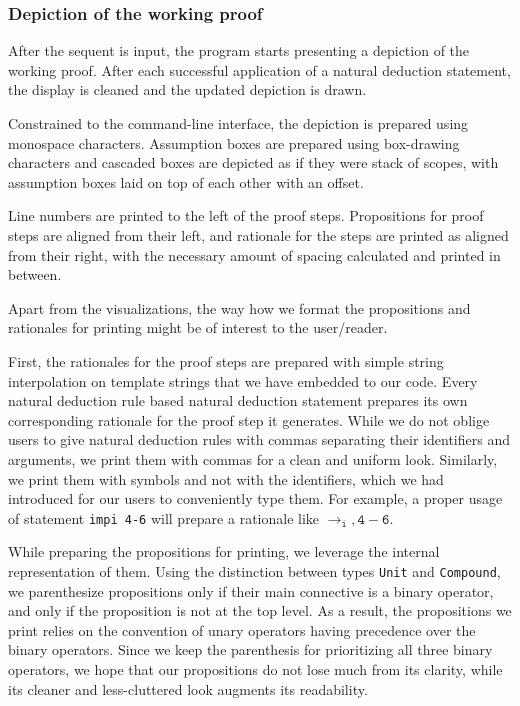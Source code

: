 \documentclass[12pt]{article}
\begin{document}
\subsubsection{Depiction of the working proof}

After the sequent is input, the program starts presenting a depiction
of the working proof. After each successful application of a natural
deduction statement, the display is cleaned and the updated depiction
is drawn.

Constrained to the command-line interface, the depiction is prepared
using monospace characters. Assumption boxes are prepared using
box-drawing characters and cascaded boxes are depicted as if they
were stack of scopes, with assumption boxes laid on top of each other
with an offset.

Line numbers are printed to the left of the proof steps.
Propositions for proof steps are aligned from their left,
and rationale for the steps are printed as aligned from their
right, with the necessary amount of spacing calculated and
printed in between.

Apart from the visualizations, the way how we format the propositions
and rationales for printing might be of interest to the user/reader.

First, the rationales for the proof steps are prepared with simple
string interpolation on template strings that we have embedded
to our code. Every natural deduction rule based natural deduction
statement prepares its own corresponding rationale for the proof
step it generates. While we do not oblige users to give natural
deduction rules with commas separating their identifiers and
arguments, we print them with commas for a clean and uniform look.
Similarly, we print them with symbols and not with the identifiers,
which we had introduced for our users to conveniently type them.
For example, a proper usage of statement \texttt{impi 4-6} will
prepare a rationale like $\mathtt{\rightarrow_i, 4-6}$.

While preparing the propositions for printing, we leverage the
internal representation of them. Using the distinction between
types \verb|Unit| and \verb|Compound|, we parenthesize propositions
only if their main connective is a binary operator, and only if the
proposition is not at the top level. As a result, the propositions
we print relies on the convention of unary operators having precedence
over the binary operators. Since we keep the parenthesis for prioritizing
all three binary operators, we hope that our propositions do not lose
much from its clarity, while its cleaner and less-cluttered look
augments its readability.
\end{document}
